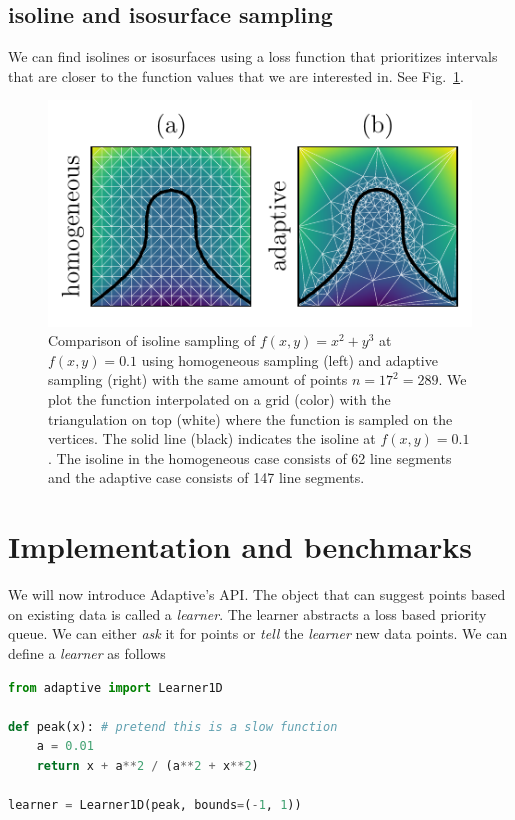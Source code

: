 \subsection{isoline and isosurface sampling}

We can find isolines or isosurfaces using a loss function that prioritizes intervals that are closer to the function values that we are interested in.
See Fig.~\ref{fig:isoline}.

\begin{figure}
\centering
\includegraphics{chapter_adaptive/figures/isoline.pdf}
\caption{Comparison of isoline sampling of $f(x,y)=x^2 + y^3$ at $f(x,y)=0.1$ using homogeneous sampling (left) and adaptive sampling (right) with the same amount of points $n=17^2=289$.
We plot the function interpolated on a grid (color) with the triangulation on top (white) where the function is sampled on the vertices.
The solid line (black) indicates the isoline at $f(x,y)=0.1$.
The isoline in the homogeneous case consists of 62 line segments and the adaptive case consists of 147 line segments.\label{fig:isoline}}
\end{figure}

\section{Implementation and benchmarks}


We will now introduce Adaptive's API.
The object that can suggest points based on existing data is called a \emph{learner}.
The learner abstracts a loss based priority queue.
We can either \emph{ask} it for points or \emph{tell} the \emph{learner} new data points.
We can define a \emph{learner} as follows

\begin{lstlisting}[language=Python]
from adaptive import Learner1D

def peak(x): # pretend this is a slow function
    a = 0.01
    return x + a**2 / (a**2 + x**2)

learner = Learner1D(peak, bounds=(-1, 1))
\end{lstlisting}


